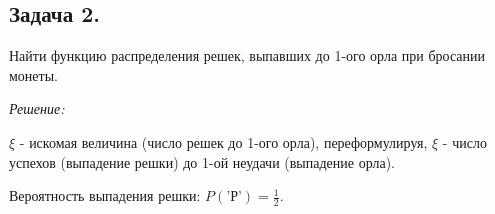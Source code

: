 \begin{figure}[H]
\end{figure}
\begin{figure}[H]
\end{figure}

\subsection*{Задача 2.}

Найти функцию распределения решек, выпавших до 1-ого орла при бросании монеты.

\noindent \textit{Решение:}

$\xi$ - искомая величина (число решек до 1-ого орла), переформулируя,  $\xi$ - число успехов (выпадение решки) до 1-ой неудачи (выпадение орла).

Вероятность выпадения решки: $P(\text{'Р'}) = \frac{1}{2}$.

